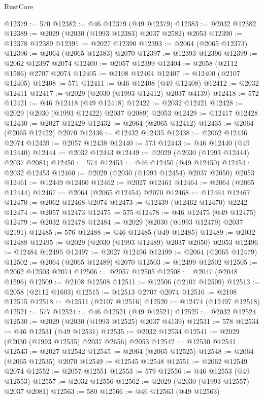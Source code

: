 \begin{lexlean}{RustCore}
\begin{coremodule}
@12379 := 570
@12382 := @46 @12379 (@49 @12379)
@12383 := @2032 @12382
@12389 := @2029 (@2030 (@1993 @12383) @2037 @2582) @2053
@12390 := @12378 @12389
@12391 := @2027 @12390
@12393 := @2064 (@2065 @12373)
@12396 := @2064 (@2065 @12383) @2070
@12397 := @12393 @12396
@12399 := @2062 @12397 @2074
@12400 := @2057 @12399
@12404 := @2058 (@2112 @1586) @2707 @2074
@12405 := @2108 @12404
@12407 := @12400 (@2107 @12405)
@12408 := 571
@12411 := @46 @12408 (@49 @12408)
@12412 := @2032 @12411
@12417 := @2029 (@2030 (@1993 @12412) @2037 @4139)
@12418 := 572
@12421 := @46 @12418 (@49 @12418)
@12422 := @2032 @12421
@12428 := @2029 (@2030 (@1993 @12422) @2037 @2089) @2053
@12429 := @12417 @12428
@12430 := @2027 @12429
@12432 := @2064 (@2065 @12412)
@12435 := @2064 (@2065 @12422) @2070
@12436 := @12432 @12435
@12438 := @2062 @12436 @2074
@12439 := @2057 @12438
@12440 := 573
@12443 := @46 @12440 (@49 @12440)
@12444 := @2032 @12443
@12449 := @2029 (@2030 (@1993 @12444) @2037 @2081)
@12450 := 574
@12453 := @46 @12450 (@49 @12450)
@12454 := @2032 @12453
@12460 := @2029 (@2030 (@1993 @12454) @2037 @2050) @2053
@12461 := @12449 @12460
@12462 := @2027 @12461
@12464 := @2064 (@2065 @12444)
@12467 := @2064 (@2065 @12454) @2070
@12468 := @12464 @12467
@12470 := @2062 @12468 @2074
@12473 := @12439 (@12462 @12470) @2242
@12474 := @2057 @12473
@12475 := 575
@12478 := @46 @12475 (@49 @12475)
@12479 := @2032 @12478
@12484 := @2029 (@2030 (@1993 @12479) @2037 @2191)
@12485 := 576
@12488 := @46 @12485 (@49 @12485)
@12489 := @2032 @12488
@12495 := @2029 (@2030 (@1993 @12489) @2037 @2050) @2053
@12496 := @12484 @12495
@12497 := @2027 @12496
@12499 := @2064 (@2065 @12479)
@12502 := @2064 (@2065 @12489) @2070
@12503 := @12499 @12502
@12505 := @2062 @12503 @2074
@12506 := @2057 @12505
@12508 := @2047 (@2048 @1596)
@12509 := @2108 @12508
@12511 := @12506 (@2107 @12509)
@12513 := @2058 (@2112 @1603)
@12515 := @12513 @2707 @2074
@12516 := @2108 @12515
@12518 := @12511 (@2107 @12516)
@12520 := @12474 (@12497 @12518)
@12521 := 577
@12524 := @46 @12521 (@49 @12521)
@12525 := @2032 @12524
@12530 := @2029 (@2030 (@1993 @12525) @2037 @4139)
@12531 := 578
@12534 := @46 @12531 (@49 @12531)
@12535 := @2032 @12534
@12541 := @2029 (@2030 (@1993 @12535) @2037 @2656) @2053
@12542 := @12530 @12541
@12543 := @2027 @12542
@12545 := @2064 (@2065 @12525)
@12548 := @2064 (@2065 @12535) @2070
@12549 := @12545 @12548
@12551 := @2062 @12549 @2074
@12552 := @2057 @12551
@12553 := 579
@12556 := @46 @12553 (@49 @12553)
@12557 := @2032 @12556
@12562 := @2029 (@2030 (@1993 @12557) @2037 @2081)
@12563 := 580
@12566 := @46 @12563 (@49 @12563)

\end{coremodule}
\end{lexlean}

